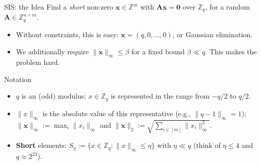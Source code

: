 \documentclass{zkdl-presentation-template}
\begin{document}
    \begin{frame}{SIS: the Idea}
        Find a \emph{short} non-zero $\mathbf{x} \in \mathbb{Z}^m$ with $\mathbf{A}\mathbf{x} = \mathbf{0}$ over $\mathbb{Z}_q$, for a random $\mathbf{A} \in \mathbb{Z}_q^{n \times m}$.
        \pause
        \begin{itemize}
            \item Without constraints, this is easy: $\mathbf{x} = (q,0,\dots,0)$, or Gaussian elimination.
            \item We additionally require $\|\mathbf{x}\|_{\infty} \leq \beta$ for a fixed bound $\beta \ll q$. This makes the problem hard.
        \end{itemize}
        \pause

        \begin{block}{Notation}
            \begin{itemize}
                \item $q$ is an (odd) modulus; $x \in \mathbb{Z}_q$ is represented in the range from $-q/2$ to $q/2$.
                \item $\|x\|_{\infty}$ is the absolute value of this representative (e.g., $\|q-1\|_{\infty} = 1$); $\|\mathbf{x}\|_{\infty} := \max_i \|x_i\|_{\infty}$ and $\|\mathbf{x}\|_2 := \sqrt{\sum_{i \in [m]} \|x_i\|_{\infty}^2}$.
                \item \textbf{Short} elements: $S_{\eta} := \{x \in \mathbb{Z}_q: \|x\|_{\infty} \leq \eta\}$ with $\eta \ll q$ (think of $\eta \leq 4$ and $q \approx 2^{23}$).
            \end{itemize}
        \end{block}
    \end{frame}
\end{document}
